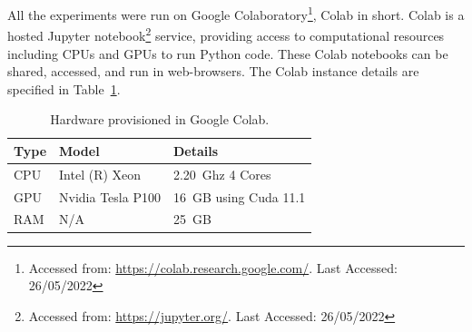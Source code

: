 All the experiments were run on Google Colaboratory\footnote{Accessed from: \url{https://colab.research.google.com/}. Last Accessed: 26/05/2022}, Colab in short. Colab is a hosted Jupyter notebook\footnote{Accessed from: \url{https://jupyter.org/}. Last Accessed: 26/05/2022} service, providing access to computational resources including CPUs and GPUs to run Python code. These Colab notebooks can be shared, accessed, and run in web-browsers.  The Colab instance details are specified in Table~\ref{tab:hardware}.

\begin{table}
	\centering
	\begin{tabular}{@{}lll@{}}
		\hline
		\textbf{Type} & \textbf{Model} & \textbf{Details} \\
		\hline
		CPU & Intel (R) Xeon & 2.20~Ghz 4 Cores \\
		GPU & Nvidia Tesla P100 & 16~GB using Cuda 11.1 \\
		RAM & N/A & 25~GB \\
		\hline
	\end{tabular}
	\caption{Hardware provisioned in Google Colab.}
	\label{tab:hardware}
\end{table}
